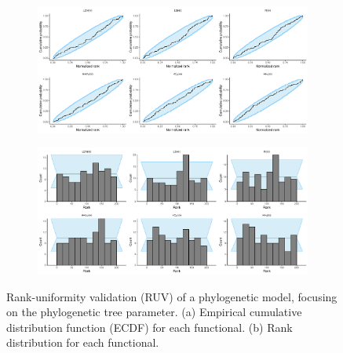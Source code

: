 \documentclass[oneside]{article}
\begin{document}
\begin{figure}
  \centering
  \vspace{0pt}
  \begin{subfigure}[t]{\textwidth}
    \caption{}
    \centering
    \includegraphics[scale=0.5]{figures/ruv_coalescent_ecdfs.pdf} 
  \end{subfigure}
  \vspace{0pt}
  \hspace{1cm}
  \begin{subfigure}[t]{\textwidth}
    \caption{}
    \centering
    \includegraphics[scale=0.5]{figures/ruv_coalescent_histograms.pdf}    
  \end{subfigure}
  \hfill
   \caption{Rank-uniformity validation (RUV) of a phylogenetic
     model, focusing on the phylogenetic tree parameter.
     (a) Empirical cumulative distribution function (ECDF) for each
     functional.
     (b) Rank distribution for each functional.
   }
   \label{supfig:ruv}
\end{figure}

\end{document}
